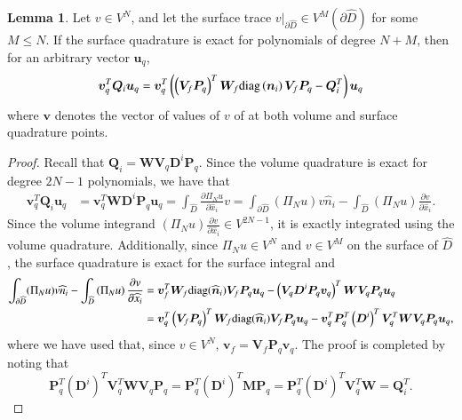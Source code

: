 \documentclass[preprint,10pt]{elsarticle}
\theoremstyle{definition}
\theoremstyle{lemma}
\newtheorem{lemma}{Lemma}
\theoremstyle{corollary}
\theoremstyle{theorem}
\theoremstyle{assumption}
\renewcommand{\hat}[1]{\widehat{#1}}
\newcommand{\pd}[2]{\frac{\partial#1}{\partial#2}}
\newcommand{\LRp}[1]{\left( #1 \right)}
\newcommand{\LRl}[1]{\left. #1 \right|}
\newcommand{\diag}[1]{{\rm diag}\LRp{#1}}
\begin{document}
\begin{lemma}
Let $v\in V^N$, and let the surface trace $\LRl{v}_{\partial \hat{D}} \in V^M\LRp{\partial \hat{D}}$ for some $M \leq N$. If the surface quadrature is exact for polynomials of degree $N+M$,  then for an arbitrary vector $\bm{u}_q$, 
\[
\bm{v}_q^T\bm{Q}_i \bm{u}_q = \bm{v}_q^T\LRp{ \LRp{\bm{V}_f\bm{P}_q}^T \bm{W}_f \diag{{\bm{n}}_i}\bm{V}_f\bm{P}_q - \bm{Q}_i^T}\bm{u}_q
\]
where $\bm{v}$ denotes the vector of values of $v$ of at both volume and surface quadrature points. 
\label{lemma:vsbp}
\end{lemma}
\begin{proof}
Recall that $\bm{Q}_i = \bm{W} \bm{V}_q \bm{D}^i\bm{P}_q$.  Since the volume quadrature is exact for degree $2N-1$ polynomials, we have that
\begin{align*}
\bm{v}_q^T\bm{Q}_i \bm{u}_q &= \bm{v}_q^T\bm{W} \bm{D}^i \bm{P}_q \bm{u}_q = \int_{\hat{D}} \pd{\Pi_N u}{\hat{x}_i} v = \int_{\partial \hat{D}} (\Pi_N u) v \hat{n}_i - \int_{\hat{D}} \LRp{\Pi_N u} \pd{v}{\hat{x}_i}.
\end{align*}
Since the volume integrand $\LRp{\Pi_N u} \pd{v}{\hat{x}_i} \in V^{2N-1}$, it is exactly integrated using the volume quadrature.  Additionally, since $\Pi_N u \in V^N$ and $v\in V^M$ on the surface of $\hat{D}$, the surface quadrature is exact for the surface integral and 
\begin{align*}
\int_{\partial \hat{D}} (\Pi_N u) v \hat{n}_i -   \int_{\hat{D}} \LRp{\Pi_N u} \pd{v}{\hat{x}_i} &= \bm{v}_f^T\bm{W}_f{\rm diag}(\hat{\bm{n}}_i) \bm{V}_f\bm{P}_q\bm{u}_q - \LRp{\bm{V}_q\bm{D}^i\bm{P}_q\bm{v}_q}^T\bm{W} \bm{V}_q\bm{P}_q\bm{u}_q\\
&= \bm{v}_q^T \LRp{\bm{V}_f\bm{P}_q}^T\bm{W}_f{\rm diag}(\hat{\bm{n}}_i) \bm{V}_f\bm{P}_q\bm{u}_q - \bm{v}_q^T \bm{P}_q^T\LRp{\bm{D}^i}^T \bm{V}_q^T \bm{W} \bm{V}_q\bm{P}_q\bm{u}_q,
\end{align*}
where we have used that, since $v\in V^N$, $\bm{v}_f = \bm{V}_f\bm{P}_q\bm{v}_q$.  The proof is completed by noting that 
\[
\bm{P}_q^T\LRp{\bm{D}^i}^T \bm{V}_q^T \bm{W} \bm{V}_q\bm{P}_q = \bm{P}_q^T\LRp{\bm{D}^i}^T \bm{M}\bm{P}_q = \bm{P}_q^T\LRp{\bm{D}^i}^T \bm{V}_q^T\bm{W} = \bm{Q}_i^T.
\]
\end{proof}
\end{document}
